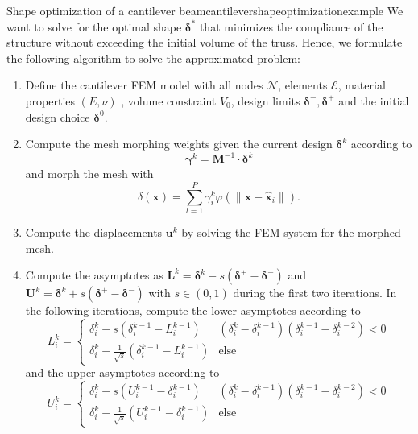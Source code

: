 \begin{example}{Shape optimization of a cantilever beam}{cantilevershapeoptimizationexample}
    We want to solve for the optimal shape $\pmb{\delta}^*$ that minimizes the compliance of the structure without exceeding the initial volume of the truss. Hence, we formulate the following algorithm to solve the approximated problem: 
    \begin{enumerate}
        \item Define the cantilever FEM model with all nodes $\mathcal{N}$, elements $\mathcal{E}$, material properties $(E, \nu)$ , volume constraint $V_0$, design limits $\pmb{\delta}^-, \pmb{\delta}^+$ and the initial design choice $\pmb{\delta}^0$.
        \item Compute the mesh morphing weights given the current design $\pmb{\delta}^k$ according to
        \begin{equation}
             \pmb{\gamma}^k = \mathbf{M}^{-1} \cdot \pmb{\delta}^k 
        \end{equation}
        and morph the mesh with 
        \begin{equation}
            \delta(\mathbf{x}) = \sum_{l=1}^P \gamma_i^k \varphi(\lVert \mathbf{x}-\hat{\mathbf{x}}_i \rVert).
        \end{equation}
        \item Compute the displacements $\mathbf{u}^k$ by solving the FEM system for the morphed mesh.
        \item Compute the asymptotes as $\mathbf{L}^k = \pmb{\delta}^k - s (\pmb{\delta}^+ - \pmb{\delta}^-)$ and $\mathbf{U}^k =\pmb{\delta}^k + s (\pmb{\delta}^+ - \pmb{\delta}^-)$ with $s \in (0,1)$ during the first two iterations. In the following iterations, compute the lower asymptotes according to 
        \begin{equation}
            L^k_i = 
            \begin{cases}
                \delta^k_i - s  (\delta^{k-1}_i-L^{k-1}_i) & (\delta_i^k-\delta_i^{k-1})(\delta_i^{k-1}-\delta_i^{k-2}) < 0\\
                \delta^k_i - \frac{1}{\sqrt{s}}  (\delta^{k-1}_i-L^{k-1}_i) & \text{else}
            \end{cases}
        \end{equation}
        and the upper asymptotes according to 
        \begin{equation}
            U^k_i = 
            \begin{cases}
                \delta^k_i + s  (U^{k-1}_i-\delta^{k-1}_i) & (\delta_i^k-\delta_i^{k-1})(\delta_i^{k-1}-\delta_i^{k-2}) < 0\\
                \delta^k_i + \frac{1}{\sqrt{s}}  (U^{k-1}_i-\delta^{k-1}_i) & \text{else}

\end{cases}
\end{equation}
\end{enumerate}
\end{example}
